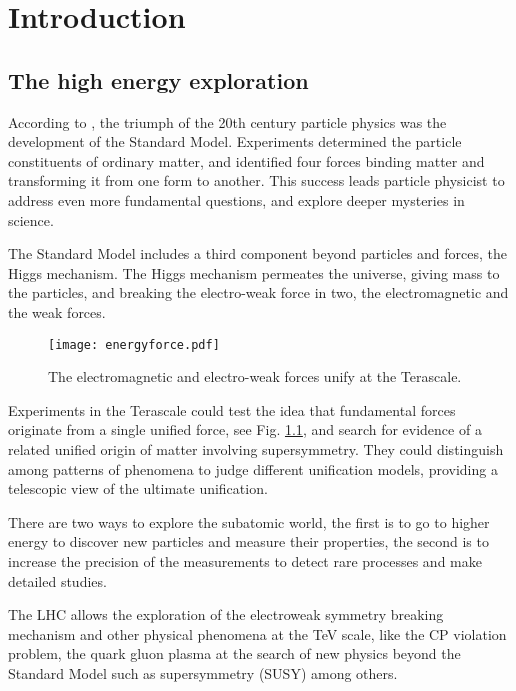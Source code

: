 \chapter{Introduction}
\section{The high energy exploration}
According to \cite{Brau:19839}, the triumph of the 20th century particle physics was the development of the Standard Model. Experiments determined the particle constituents of ordinary matter, and identified four forces binding matter and transforming it from one form to another. This success leads particle physicist to address even more fundamental questions, and explore deeper mysteries in science.\par
The Standard Model includes a third component beyond particles and forces, the Higgs mechanism. The Higgs mechanism permeates the universe, giving mass to the particles, and breaking the electro-weak force in two, the electromagnetic and the weak forces.\par
\begin{figure}[!hbt]
\centering
\texttt{[image: energyforce.pdf]}\caption{The electromagnetic and electro-weak forces unify at the Terascale.}\label{f:energyforce}
\end{figure}
Experiments in the Terascale could test the idea that fundamental forces originate from a single unified force, see Fig. \ref{f:energyforce}, and search for evidence of a related unified origin of matter involving supersymmetry. They could distinguish among patterns of phenomena to judge different unification models, providing a telescopic view of the ultimate unification.\par
There are two ways to explore the subatomic world, the first is to go to higher energy to discover new particles and measure their properties, the second is to increase the precision of the measurements to detect rare processes and make detailed studies.\par
The LHC allows the exploration of the electroweak symmetry breaking mechanism and other physical phenomena at the TeV scale, like the CP violation problem, the quark gluon plasma at the search of new physics beyond the Standard Model such as supersymmetry (SUSY) among others.\par
